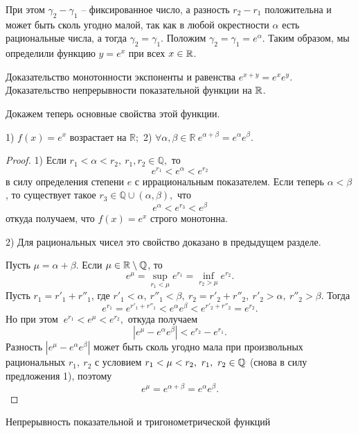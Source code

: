 При этом $\gamma_2 - \gamma_1$ -- фиксированное число,
а разность $r_2-r_1$ положительна
и может быть сколь угодно малой, так как в любой
окрестности $\alpha$ есть рациональные числа, а тогда
$\gamma_2 = \gamma_1$.
Положим $\gamma_2 = \gamma_1 = e^\alpha$.
Таким образом, мы определили функцию
$y = e^x$ при всех $x\in\mathbb{R}$.

\newpage

\begin{problem}
Доказательство монотонности экспоненты и равенства $e^{x+y}=e^xe^y$. Доказательство
непрерывности показательной функции на $\mathbb{R}$.
\end{problem}


Докажем теперь основные свойства этой
функции.
\begin{proposition}
    1) $f(x) = e^x$ возрастает на $\mathbb R;$
    2) $\forall \alpha, \beta \in \mathbb R
        \ e^{\alpha+\beta} = e^{\alpha}e^{\beta}$.
\end{proposition}
\begin{proof}
    1) Если $r_1 < \alpha < r_2, \ r_1, r_2 \in \mathbb Q,$
    то
    $$
        e^{r_1} < e^\alpha < e^{r_2}
    $$
    в силу
    определения степени $e$ с иррациональным
    показателем. Если теперь
    $\alpha < \beta$, то существует такое $r_3 \in
        \mathbb Q \cup(\alpha, \beta),$
    что
    $$
        e^\alpha < e^{r_3} < e^{\beta}
    $$
    откуда
    получаем, что $f(x)=e^x$ строго монотонна.

    2) Для рациональных
    чисел это свойство доказано
    в предыдущем разделе.

    Пусть $\mu = \alpha + \beta$.
    Если $\mu \in \mathbb R\setminus\mathbb{Q}$, то
    $$
        e^\mu =
        \sup\limits_{r_1<\mu} e^{r_1} =
        \inf\limits_{r_2>\mu}e^{r_2}.
    $$
    Пусть $r_1 = r'_1+r''_1$,
    где $r'_1<\alpha, \ r''_1<\beta, \ r_2 =
        r'_2+r''_2, \ r'_2 > \alpha, \ r''_2>\beta.$
    Тогда
    $$
        e^{r_1} = e^{r'_1+r''_1}<e^\alpha
        e^\beta < e^{r'_2+r''_2} = e^{r_2}.
    $$
    Но при этом
    $\ e^{r_1} < e^\mu < e^{r_2},$ откуда получаем
    $$
        |e^\mu - e^\alpha e^\beta| < e^{r_2} - e^{r_1}.
    $$
    Разность $|e^\mu - e^\alpha e^\beta|$
    может быть сколь угодно мала при произвольных
    рациональных $r_1, \ r_2$ с условием
    $r_1<\mu<r_2, \ r_1, \ r_2 \in \mathbb{Q}$
    (снова в силу предложения 1),
    поэтому
    $$
        e^\mu = e^{\alpha+\beta}=e^\alpha e^\beta.
    $$
\end{proof}
\begin{center}
    \textsf{Непрерывность показательной и тригонометрической функций}
\end{center}

